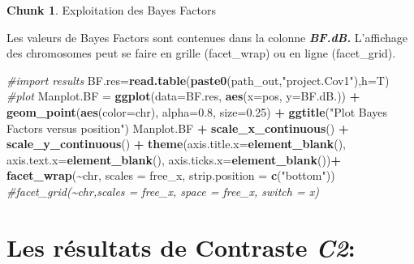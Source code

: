 \documentclass[
  openany]{book}
\newenvironment{Shaded}{\begin{snugshade}}{\end{snugshade}}
\newcommand{\AttributeTok}[1]{\textcolor[rgb]{0.13,0.29,0.53}{#1}}
\newcommand{\CommentTok}[1]{\textcolor[rgb]{0.56,0.35,0.01}{\textit{#1}}}
\newcommand{\FloatTok}[1]{\textcolor[rgb]{0.00,0.00,0.81}{#1}}
\newcommand{\FunctionTok}[1]{\textcolor[rgb]{0.13,0.29,0.53}{\textbf{#1}}}
\newcommand{\NormalTok}[1]{#1}
\newcommand{\OtherTok}[1]{\textcolor[rgb]{0.56,0.35,0.01}{#1}}
\newcommand{\SpecialCharTok}[1]{\textcolor[rgb]{0.81,0.36,0.00}{\textbf{#1}}}
\newcommand{\StringTok}[1]{\textcolor[rgb]{0.31,0.60,0.02}{#1}}
\theoremstyle{definition}
\theoremstyle{definition}
\theoremstyle{definition}
\newtheorem{exercise}{Chunk}[chapter]
\theoremstyle{definition}
\theoremstyle{remark}
\begin{document}
\begin{exercise}
\protect\hypertarget{exr:chunk8}{}\label{exr:chunk8}{Exploitation des Bayes Factors}
\end{exercise}

Les valeurs de Bayes Factors sont contenues dans la colonne \textbf{\emph{BF.dB.}}
L'affichage des chromosomes peut se faire en grille (facet\_wrap) ou en ligne (facet\_grid).

\begin{Shaded}
\begin{Highlighting}[]
\CommentTok{\#import results}
\NormalTok{BF.res}\OtherTok{=}\FunctionTok{read.table}\NormalTok{(}\FunctionTok{paste0}\NormalTok{(path\_out,}\StringTok{"project.Cov1"}\NormalTok{),}\AttributeTok{h=}\NormalTok{T)}
\CommentTok{\#plot}
\NormalTok{Manplot.BF }\OtherTok{=} \FunctionTok{ggplot}\NormalTok{(}\AttributeTok{data=}\NormalTok{BF.res, }\FunctionTok{aes}\NormalTok{(}\AttributeTok{x=}\NormalTok{pos, }\AttributeTok{y=}\NormalTok{BF.dB.)) }\SpecialCharTok{+}
  \FunctionTok{geom\_point}\NormalTok{(}\FunctionTok{aes}\NormalTok{(}\AttributeTok{color=}\NormalTok{chr), }\AttributeTok{alpha=}\FloatTok{0.8}\NormalTok{, }\AttributeTok{size=}\FloatTok{0.25}\NormalTok{) }\SpecialCharTok{+}
  \FunctionTok{ggtitle}\NormalTok{(}\StringTok{"Plot Bayes Factors versus position"}\NormalTok{)}
\NormalTok{Manplot.BF }\SpecialCharTok{+} \FunctionTok{scale\_x\_continuous}\NormalTok{() }\SpecialCharTok{+}
  \FunctionTok{scale\_y\_continuous}\NormalTok{() }\SpecialCharTok{+}
  \FunctionTok{theme}\NormalTok{(}\AttributeTok{axis.title.x=}\FunctionTok{element\_blank}\NormalTok{(), }\AttributeTok{axis.text.x=}\FunctionTok{element\_blank}\NormalTok{(), }\AttributeTok{axis.ticks.x=}\FunctionTok{element\_blank}\NormalTok{())}\SpecialCharTok{+}
  \FunctionTok{facet\_wrap}\NormalTok{(}\SpecialCharTok{\textasciitilde{}}\NormalTok{chr, }\AttributeTok{scales =} \StringTok{\textquotesingle{}free\_x\textquotesingle{}}\NormalTok{, }\AttributeTok{strip.position =} \FunctionTok{c}\NormalTok{(}\StringTok{"bottom"}\NormalTok{))}
  \CommentTok{\#facet\_grid(\textasciitilde{}chr,scales = \textquotesingle{}free\_x\textquotesingle{}, space = \textquotesingle{}free\_x\textquotesingle{}, switch = \textquotesingle{}x\textquotesingle{})}
\end{Highlighting}
\end{Shaded}

\hypertarget{les-ruxe9sultats-de-contraste-c2}{%
\section*{\texorpdfstring{Les résultats de Contraste \emph{C2}:}{Les résultats de Contraste C2:}}\label{les-ruxe9sultats-de-contraste-c2}}
\end{document}
